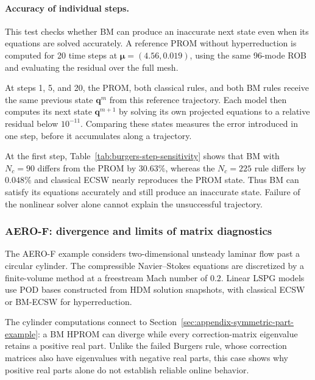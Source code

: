 \documentclass[a4paper,12pt]{article}
\newcommand{\vect}[1]{\boldsymbol{#1}}
\begin{document}
\paragraph{Accuracy of individual steps.}
This test checks whether BM can produce an inaccurate next state even when its equations are solved accurately. A reference PROM without hyperreduction is computed for 20 time steps at $\vect{\mu}=(4.56,0.019)$, using the same 96-mode ROB and evaluating the residual over the full mesh.

At steps 1, 5, and 20, the PROM, both classical rules, and both BM rules receive the same previous state $\vect{q}^m$ from this reference trajectory. Each model then computes its next state $\vect{q}^{m+1}$ by solving its own projected equations to a relative residual below $10^{-11}$. Comparing these states measures the error introduced in one step, before it accumulates along a trajectory.

At the first step, Table~\ref{tab:burgers-step-sensitivity} shows that BM with $N_c=90$ differs from the PROM by $30.63\%$, whereas the $N_c=225$ rule differs by $0.048\%$ and classical ECSW nearly reproduces the PROM state. Thus BM can satisfy its equations accurately and still produce an inaccurate state. Failure of the nonlinear solver alone cannot explain the unsuccessful trajectory.

\begin{table}[H]
 \centering\small
 \setlength{\tabcolsep}{4pt}
 \caption{Burgers first-step accuracy at $\vect{\mu}=(4.56,0.019)$. State errors are against the PROM. The symmetric-part ratio and condition number $\kappa_2$ refer to the correction matrix at the shared initial guess.}
 \label{tab:burgers-step-sensitivity}
 
\end{table}

\subsubsection{AERO-F: divergence and limits of matrix diagnostics}
\label{sec:appendix-symmetric-part-aerof}

The AERO-F example considers two-dimensional unsteady laminar flow past a circular cylinder. The compressible Navier--Stokes equations are discretized by a finite-volume method at a freestream Mach number of $0.2$. Linear LSPG models use POD bases constructed from HDM solution snapshots, with classical ECSW or BM-ECSW for hyperreduction.

The cylinder computations connect to Section~\ref{sec:appendix-symmetric-part-example}: a BM HPROM can diverge while every correction-matrix eigenvalue retains a positive real part. Unlike the failed Burgers rule, whose correction matrices also have eigenvalues with negative real parts, this case shows why positive real parts alone do not establish reliable online behavior.
\end{document}
